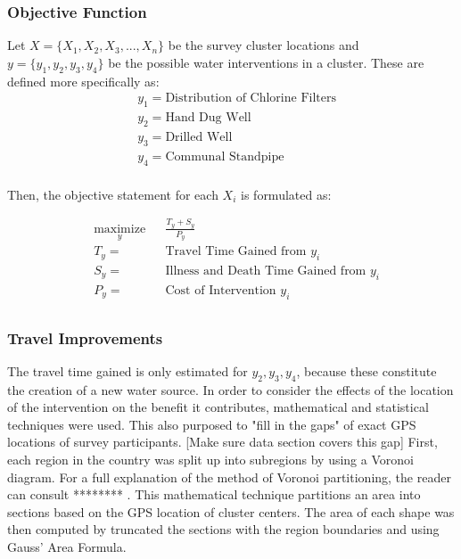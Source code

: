 \subsubsection*{Objective Function}
Let $X = \{X_1,X_2,X_3,...,X_n\}$ be the survey cluster locations and $y = \{y_1,y_2,y_3,y_4\}$ be the possible water interventions in a cluster.
These are defined more specifically as:
\begin{equation}
\begin{aligned} 
& y_1 = \text{Distribution of Chlorine Filters}\\
& y_2 = \text{Hand Dug Well}\\
& y_3 = \text{Drilled Well}\\
& y_4 = \text{Communal Standpipe}\\
\end{aligned}
\end{equation}

Then, the objective statement for each $X_i$ is formulated as: %

\begin{equation}
\begin{aligned}
& \underset{y}{\text{maximize}}
& & \frac{T_y + S_y}{P_y}  \\
& T_y =
& & \text{Travel Time Gained from } y_i \\
& S_y =
& & \text{Illness and Death Time Gained from } y_i \\
& P_y =
& & \text{Cost of Intervention } y_i \\
\end{aligned}
\end{equation}

\subsubsection*{Travel Improvements}
The travel time gained is only estimated for $y_2,y_3,y_4$, because these constitute the creation of a new water source.
In order to consider the effects of the location of the intervention on the benefit it contributes, mathematical and statistical techniques were used.
This also purposed to "fill in the gaps" of exact GPS locations of survey participants.
[Make sure data section covers this gap]
First, each region in the country was split up into subregions by using a Voronoi diagram.
For a full explanation of the method of Voronoi partitioning, the reader can consult ******** .
This mathematical technique partitions an area into sections based on the GPS location of cluster centers. %
The area of each shape was then computed by truncated the sections with the region boundaries and using Gauss' Area Formula. %

